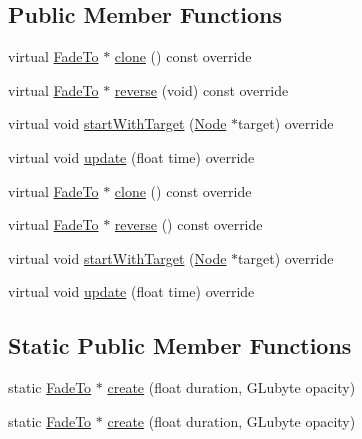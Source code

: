 \subsection*{Public Member Functions}
\begin{DoxyCompactItemize}
\item 
virtual \hyperlink{classFadeTo}{Fade\+To} $\ast$ \hyperlink{classFadeTo_a662485a4513a6e717db8df6c6065c284}{clone} () const override
\item 
virtual \hyperlink{classFadeTo}{Fade\+To} $\ast$ \hyperlink{classFadeTo_a40e463b17c90aa34c3ffe0c3dc016742}{reverse} (void) const override
\item 
virtual void \hyperlink{classFadeTo_a7846758ff3760d099ca70c279c52bde0}{start\+With\+Target} (\hyperlink{classNode}{Node} $\ast$target) override
\item 
virtual void \hyperlink{classFadeTo_a1ce1e954d444943c1ec9923f14b3c599}{update} (float time) override
\item 
virtual \hyperlink{classFadeTo}{Fade\+To} $\ast$ \hyperlink{classFadeTo_a1968e50c43c66d7b7efd4a6718183c3c}{clone} () const override
\item 
virtual \hyperlink{classFadeTo}{Fade\+To} $\ast$ \hyperlink{classFadeTo_ae67d300f60edd18e3e15863223d13040}{reverse} () const override
\item 
virtual void \hyperlink{classFadeTo_a80f8df2c2e9e4755c8ecf076e0d3f71c}{start\+With\+Target} (\hyperlink{classNode}{Node} $\ast$target) override
\item 
virtual void \hyperlink{classFadeTo_a677de8611ab23718408f8da3fe9121dc}{update} (float time) override
\end{DoxyCompactItemize}
\subsection*{Static Public Member Functions}
\begin{DoxyCompactItemize}
\item 
static \hyperlink{classFadeTo}{Fade\+To} $\ast$ \hyperlink{classFadeTo_a5c86a750b0b092fb079ffb076e9ebf41}{create} (float duration, G\+Lubyte opacity)
\item 
static \hyperlink{classFadeTo}{Fade\+To} $\ast$ \hyperlink{classFadeTo_a6ab4d18c787e2bbfdee0270e5b00de2b}{create} (float duration, G\+Lubyte opacity)
\end{DoxyCompactItemize}
